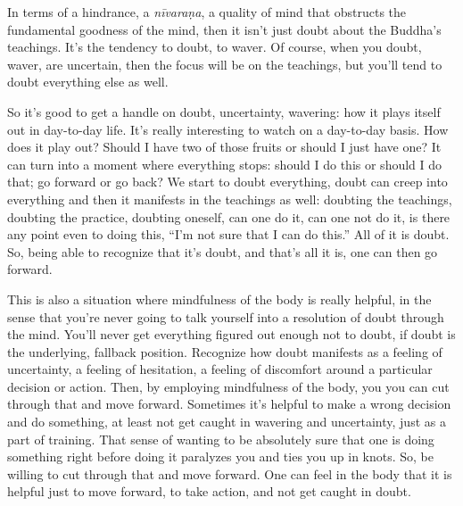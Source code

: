 In terms of a hindrance, a \emph{nīvaraṇa}, a quality of mind that
obstructs the fundamental goodness of the mind, then it isn’t just doubt
about the Buddha’s teachings. It’s the tendency to doubt, to waver. Of
course, when you doubt, waver, are uncertain, then the focus will be on
the teachings, but you’ll tend to doubt everything else as well.

So it’s good to get a handle on doubt, uncertainty, wavering: how it
plays itself out in day-to-day life. It’s really interesting to watch on
a day-to-day basis. How does it play out? Should I have two of those
fruits or should I just have one? It can turn into a moment where
everything stops: should I do this or should I do that; go forward or go
back? We start to doubt everything, doubt can creep into everything and
then it manifests in the teachings as well: doubting the teachings,
doubting the practice, doubting oneself, can one do it, can one not do
it, is there any point even to doing this, “I’m not sure that I can do
this.” All of it is doubt. So, being able to recognize that it’s doubt,
and that’s all it is, one can then go forward.

This is also a situation where mindfulness of the body is really
helpful, in the sense that you’re never going to talk yourself into a
resolution of doubt through the mind. You’ll never get everything
figured out enough not to doubt, if doubt is the underlying, fallback
position. Recognize how doubt manifests as a feeling of uncertainty, a
feeling of hesitation, a feeling of discomfort around a particular
decision or action. Then, by employing mindfulness of the body, you you
can cut through that and move forward. Sometimes it’s helpful to make a
wrong decision and do something, at least not get caught in wavering and
uncertainty, just as a part of training. That sense of wanting to be
absolutely sure that one is doing something right before doing it
paralyzes you and ties you up in knots. So, be willing to cut through
that and move forward. One can feel in the body that it is helpful just
to move forward, to take action, and not get caught in doubt.
